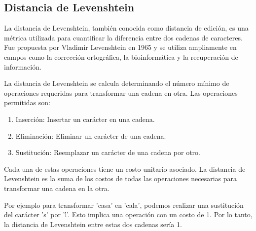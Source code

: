 \documentclass[a4paper, 12pt]{article}
\begin{document}
\subsection{Distancia de Levenshtein}
La distancia de Levenshtein, también conocida como distancia de edición, es una métrica utilizada para cuantificar la diferencia entre dos cadenas de caracteres. Fue propuesta por Vladimir Levenshtein en 1965 y se utiliza ampliamente en campos como la corrección ortográfica, la bioinformática y la recuperación de información.

La distancia de Levenshtein se calcula determinando el número mínimo de operaciones requeridas para transformar una cadena en otra. Las operaciones permitidas son:
\begin{enumerate}

\item Inserción: Insertar un carácter en una cadena.
\item Eliminación: Eliminar un carácter de una cadena.
\item Sustitución: Reemplazar un carácter de una cadena por otro.
\end{enumerate}
Cada una de estas operaciones tiene un costo unitario asociado. La distancia de Levenshtein es la suma de los costos de todas las operaciones necesarias para transformar una cadena en la otra.

Por ejemplo para transformar 'casa' en 'cala', podemos realizar una sustitución del carácter 's' por 'l'. Esto implica una operación con un costo de 1. Por lo tanto, la distancia de Levenshtein entre estas dos cadenas sería 1.
\end{document}
